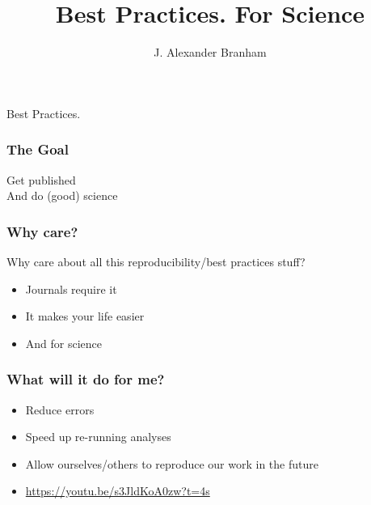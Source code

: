 \documentclass[bigger, aspectratio=169]{beamer}
\title{Best Practices. For Science}
\author{J. Alexander Branham}
\begin{document}
{
  \begin{frame}
    \vspace{-2.5in} \hspace{2.75in} \Huge{\color{white} Best Practices.} 
  \end{frame}
}

\begin{frame}
  \frametitle{The Goal}
  \pause{}
  \centering
  \Huge{Get published}\\
  \pause{} \vspace{1in}
  \small{And do (good) science}
\end{frame}

\begin{frame}
  \frametitle{Why care?}
  Why care about all this reproducibility/best practices stuff? 
  \pause{}
  \begin{itemize}
  \item Journals require it
  \item It makes your life easier
  \item And for science 
  \end{itemize}
\end{frame}

\begin{frame}
  \frametitle{What will it do for me?}
  \pause{}
  \begin{itemize}
  \item Reduce errors
  \item Speed up re-running analyses
  \item Allow ourselves/others to reproduce our work in the future
  \item \url{https://youtu.be/s3JldKoA0zw?t=4s}
  \end{itemize}
\end{frame}
\end{document}
